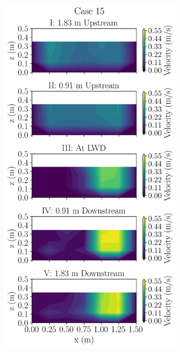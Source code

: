 \documentclass[preview, border=2pt]{standalone}
\begin{document}
\begin{figure}
\begin{subfigure}[b]{0.24\textwidth}
     \end{subfigure}
     \hfill     
     \begin{subfigure}[b]{0.24\textwidth}
         \centering
         \caption{}
         \includegraphics[width=\textwidth]{Case15_velocity_contours.png}
     \end{subfigure}
\end{figure}
\end{document}
